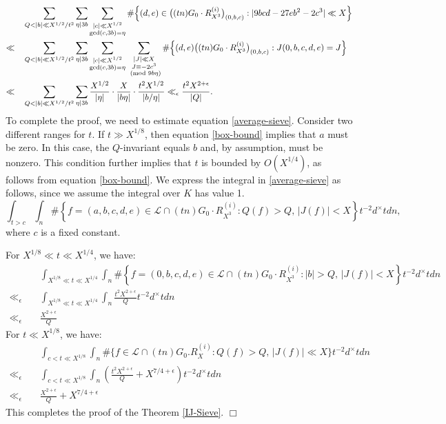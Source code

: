 \documentclass{article}
\newenvironment{customproof}[1][]
{\par\noindent{\textbf{Proof of #1:}}\quad}
{$\Box$ \vspace{2 ex}}
\def \gcd{{\rm gcd}}
\begin{document}
\begin{customproof}[Theorem \ref{IJ-Sieve}]
\begin{align*}
&\sum_{ Q<|b|\ll X^{1/2}/t^2} \sum_{\eta | 3b} \sum_{\substack{|c| \ll X^{1/2}\\\gcd(c,3b) =\eta}} \#\Big\{(d,e)\in \big((tn)G_0\cdot R^{(i)}_{X^3}\big)_{(0,b,c)}: |9bcd-27eb^2-2c^3|\ll X \Big\} \\ \ll \quad
&\sum_{ Q<|b|\ll X^{1/2}/t^2} \sum_{\eta | 3b} \sum_{\substack{|c| \ll X^{1/2}\\\gcd(c,3b) =\eta}}
\sum_{\substack{|J|\ll X\\
J \equiv -2c^3\\ \pmod {9b\eta}}} \#\Big\{(d,e) \big((tn)G_0\cdot R^{(i)}_{X^3}\big)_{(0,b,c)}: J(0,b,c,d,e)=J \Big\}
\\ \ll \quad
&\sum_{Q<|b|\ll X^{1/2}/t^2} \sum_{\eta|3b} \frac{X^{1/2}}{|\eta|}\cdot \frac{X}{|b\eta|}\cdot \frac{t^2X^{1/2}}{|b/\eta|} \ll_{\epsilon}
\frac{t^2X^{2+\epsilon}}{|Q|}.
\end{align*}
To complete the proof, we need to estimate equation \eqref{average-sieve}. Consider two different ranges for $t$. If $t \gg X^{1/8}$, then equation \eqref{box-bound} implies that $a$ must be zero. In this case, the $Q$-invariant equals $b$ and, by assumption, must be nonzero. This condition further implies that $t$ is bounded by $O(X^{1/4})$, as follows from equation \eqref{box-bound}. We express the integral in \eqref{average-sieve} as follows, since we assume the integral over $K$ has value 1.
\begin{equation*}
    \int_{t>c} \int_n \#\left\{f=(a,b,c,d,e) \in \mathcal{L}\cap (tn)G_0\cdot R^{(i)}_{X^3}: Q(f)>Q, \, |J(f)|<X\right\}  t^{-2}d^{\times}tdn,
\end{equation*}
where $c$ is a fixed constant.

\noindent
For $X^{1/8} \ll t \ll X^{1/4}$, we have:
\begin{align*}
&\int_{X^{1/8}\ll t\ll X^{1/4}} \int_n \#\left\{f=(0,b,c,d,e) \in \mathcal{L}\cap (tn)G_0\cdot R^{(i)}_{X^3}:|b|>Q, \, |J(f)|<X\right\}  t^{-2}d^{\times}tdn \\ \ll_{\epsilon} \quad
& \int_{X^{1/8}\ll t\ll X^{1/4}} \int_n  \frac{t^2X^{2+\epsilon}}{Q} t^{-2}d^{\times}tdn \\ \ll_{\epsilon} \quad
&\frac{X^{2+\epsilon}}{Q}  
\end{align*}
For $t\ll X^{1/8}$, we have:
\begin{align*}
&\int_{c<t\ll X^{1/8}} \int_n \#\Big\{f \in \mathcal{L}\cap (tn)G_0.R^{(i)}_{X}:Q(f)>Q, \, |J(f)|\ll X \Big\}  t^{-2}d^{\times}tdn\\ \ll_{\epsilon} \quad
& \int_{c<t\ll X^{1/8}} \int_n  \left(\frac{t^2X^{2+\epsilon}}{Q}+X^{7/4+\epsilon}\right) t^{-2}d^{\times}tdn \\ \ll_{\epsilon} \quad
& \frac{X^{2+\epsilon}}{Q}+X^{7/4+\epsilon}
\end{align*}
This completes the proof of the Theorem \ref{IJ-Sieve}. 
\end{customproof}
 
\end{document}
